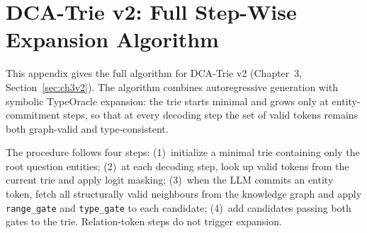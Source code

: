 
\chapter{DCA-Trie v2: Full Step-Wise Expansion Algorithm}
\label{AppendixD}

This appendix gives the full algorithm for DCA-Trie v2 (Chapter~3, Section~\ref{sec:ch3v2}). The algorithm combines autoregressive generation with symbolic TypeOracle expansion: the trie starts minimal and grows only at entity-commitment steps, so that at every decoding step the set of valid tokens remains both graph-valid and type-consistent.

The procedure follows four steps: (1)~initialize a minimal trie containing only the root question entities; (2)~at each decoding step, look up valid tokens from the current trie and apply logit masking; (3)~when the LLM commits an entity token, fetch all structurally valid neighbours from the knowledge graph and apply \texttt{range\_gate} and \texttt{type\_gate} to each candidate; (4)~add candidates passing both gates to the trie. Relation-token steps do not trigger expansion.

